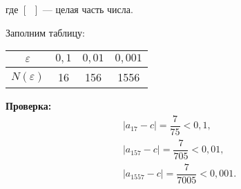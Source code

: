 \documentclass[12pt]{article}
\newcommand{\eps}{\varepsilon}
\begin{document}
где $[\phantom{a}]$ --- целая часть числа.

Заполним таблицу:
\begin{center}
	\begin{tabular}{|c|c|c|c|}
		\hline
		$\eps$ &  $0{,}1$ & $0{,}01$ & $0{,}001$ \\
		\hline
		$N(\eps)$ & 16 & 156 & 1556 \\
		\hline
	\end{tabular}
\end{center}
\textbf{Проверка:}
$$
\begin{array}{l}
|a_{17} - c| = \dfrac{7}{75} < 0{,}1,			\\[10pt]
|a_{157} - c| = \dfrac{7}{705} < 0{,}01,	\\[10pt]
|a_{1557} - c| = \dfrac{7}{7005} < 0{,}001.
\end{array}
$$

\end{document}
